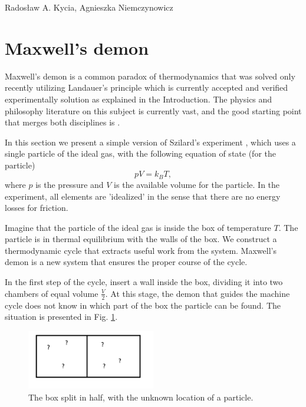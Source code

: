 \begin{artengenv2auth}{Rados\l aw A. Kycia, Agnieszka Niemczynowicz}
\section{Maxwell's demon}
Maxwell's demon is a common paradox of thermodynamics that was solved only recently utilizing Landauer's principle \parencites{Landauer, Bennet, Feynman} which is currently accepted and verified experimentally solution as explained in the Introduction. The physics and philosophy literature on this subject is currently vast, and the good starting point that merges both disciplines is  \parencite{LandauerExplained}.

In this section we present a simple version of Szilard's experiment \parencites{Szilard, Feynman}, which uses a single particle of the ideal gas, with the following equation of state (for the particle) \parencites{KyciaLandauer2, LychaginThermodynamics, EivindThermodynamics}
\begin{equation}
pV=k_{B}T, 
\end{equation}
where $p$ is the pressure and $V$ is the available volume for the particle. In the experiment, all elements are 'idealized' in the sense that there are no energy losses for friction. 

Imagine that the particle of the ideal gas is inside the box of temperature $T$. The particle is in thermal equilibrium with the walls of the box. We construct a thermodynamic cycle that extracts useful work from the system. Maxwell's demon is a new system that ensures the proper course of the cycle.

In the first step of the cycle, insert a wall inside the box, dividing it into two chambers of equal volume $\frac{V}{2}$. At this stage, the demon that guides the machine cycle does not know in which part of the box the particle can be found. The situation is presented in Fig. \ref{Fig.Szilard_StateUnknown}.
\begin{figure}
\centering
 \includegraphics[width=0.5\textwidth]{ART_Kycia_Niemczynowicz/Demon1.png}
 \caption{The box split in half, with the unknown location of a particle.}
 \label{Fig.Szilard_StateUnknown}
\end{figure}


\end{artengenv2auth}
